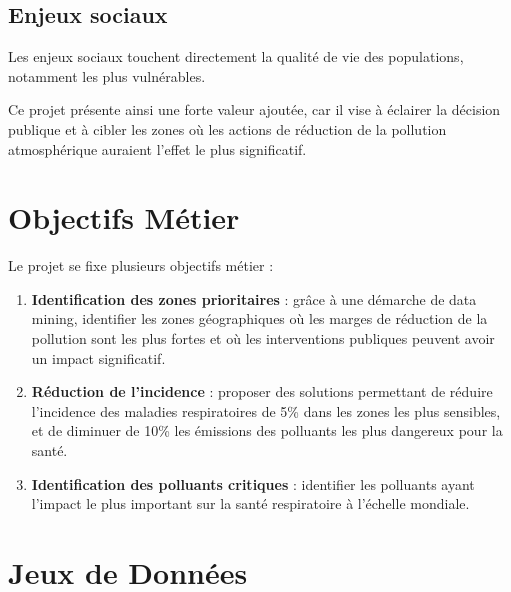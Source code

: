 \documentclass[11pt,a4paper]{article}
\begin{document}
\subsection{Enjeux sociaux}
Les enjeux sociaux touchent directement la qualité de vie des populations, notamment les plus vulnérables.

\vspace{0.5cm}
Ce projet présente ainsi une forte valeur ajoutée, car il vise à éclairer la décision publique et à cibler les zones où les actions de réduction de la pollution atmosphérique auraient l'effet le plus significatif.

\section{Objectifs Métier}

Le projet se fixe plusieurs objectifs métier :

\begin{enumerate}
    \item \textbf{Identification des zones prioritaires} : grâce à une démarche de data mining, identifier les zones géographiques où les marges de réduction de la pollution sont les plus fortes et où les interventions publiques peuvent avoir un impact significatif.

    \item \textbf{Réduction de l'incidence} : proposer des solutions permettant de réduire l'incidence des maladies respiratoires de 5\% dans les zones les plus sensibles, et de diminuer de 10\% les émissions des polluants les plus dangereux pour la santé.

    \item \textbf{Identification des polluants critiques} : identifier les polluants ayant l'impact le plus important sur la santé respiratoire à l'échelle mondiale.
\end{enumerate}

\clearpage
\section{Jeux de Données}
\label{sec:jeux-de-donnees}
\end{document}
